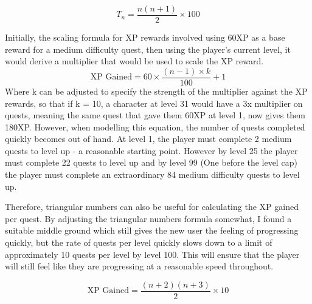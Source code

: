 \begin{equation} \label{eq:xprequiredfornextlevel}
	T_n= \frac{n(n+1)}{2} \times 100
\end{equation}

Initially, the scaling formula for XP rewards involved using 60XP as a base reward for a medium difficulty quest, then using the player's current level, it would derive a multiplier that would be used to scale the XP reward.
\begin{equation} \label{eq:xpgainedlinear}
	\textrm{XP Gained} = 60 \times \frac{(n - 1) \times k}{100} + 1
\end{equation}
Where k can be adjusted to specify the strength of the multiplier against the XP rewards, so that if k = 10, a character at level 31 would have a 3x multiplier on quests, meaning the same quest that gave them 60XP at level 1, now gives them 180XP.
However, when modelling this equation, the number of quests completed quickly becomes out of hand. 
At level 1, the player must complete 2 medium quests to level up - a reasonable starting point.
However by level 25 the player must complete 22 quests to level up and by level 99 (One before the level cap) the player must complete an extraordinary 84 medium difficulty quests to level up.

Therefore, triangular numbers can also be useful for calculating the XP gained per quest. By adjusting the triangular numbers formula somewhat, I found a suitable middle ground which still gives the new user the feeling of progressing quickly, but the rate of quests per level quickly slows down to a limit of approximately 10 quests per level by level 100.
This will ensure that the player will still feel like they are progressing at a reasonable speed throughout.

\begin{equation} \label{eq:xpgainedtriangular}
	\textrm{XP Gained} = \frac{(n+2)(n+3)}{2} \times 10
\end{equation}




